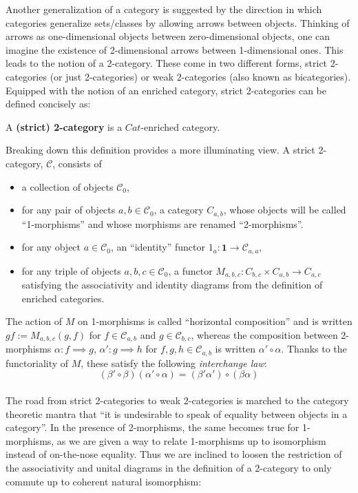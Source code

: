 Another generalization of a category is suggested by the direction in which categories generalize sets/classes by allowing arrows between objects. Thinking of arrows as one-dimensional objects between zero-dimensional objects, one can imagine the existence of 2-dimensional arrows between 1-dimensional ones. This leads to the notion of a 2-category. These come in two different forms, strict 2-categories (or just 2-categories) or weak 2-categories (also known as bicategories). Equipped with the notion of an enriched category, strict 2-categories can be defined concisely as:
\begin{defn}
  A \textbf{(strict) 2-category} is a $Cat$-enriched category.
\end{defn}
Breaking down this definition provides a more illuminating view. A strict 2-category, $\mathcal{C}$, consists of
\begin{itemize}
\item a collection of objects $\mathcal{C}_0$,
\item for any pair of objects $a, b \in \mathcal{C}_0$, a category $C_{a, b}$, whose objects will be called ``1-morphisms'' and whose morphisms are renamed ``2-morphisms''.
\item for any object $a \in \mathcal{C}_0$, an ``identity'' functor $1_a : \mathbf{1} \to \mathcal{C}_{a, a}$, 
\item for any triple of objects $a, b, c \in \mathcal{C}_0$, a functor $M_{a,b,c} : C_{b, c} \times C_{a, b} \to C_{a, c}$
  satisfying the associativity and identity diagrams from the definition of enriched categories.
\end{itemize}
The action of $M$ on 1-morphisms is called ``horizontal composition'' and is written $gf := M_{a,b,c}(g, f)$ for $f \in \mathcal{C}_{a, b}$ and $g \in \mathcal{C}_{b, c}$, whereas the composition between 2-morphisms $\alpha : f \implies g$, $\alpha' : g \implies h$ for $f, g, h \in \mathcal{C}_{a, b}$ is written $\alpha' \circ \alpha$.
Thanks to the functoriality of $M$, these satisfy the following \textit{interchange law}:
\[
  (\beta' \circ \beta)(\alpha'\circ \alpha)=(\beta'\alpha')\circ(\beta\alpha)
\]\\
The road from strict 2-categories to weak 2-categories is marched to the category theoretic mantra that ``it is undesirable to speak of equality between objects in a category''. In the presence of 2-morphisms, the same becomes true for 1-morphisms, as we are given a way to relate 1-morphisms up to isomorphism instead of on-the-nose equality. Thus we are inclined to loosen the restriction of the associativity and unital diagrams in the definition of a 2-category to only commute up to coherent natural isomorphism:
